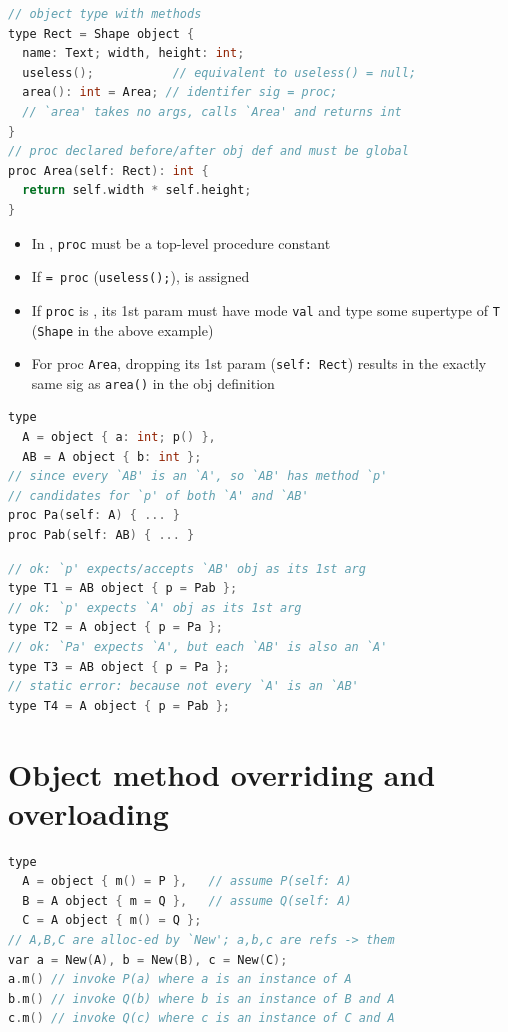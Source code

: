 \documentclass[10pt,a4paper,landscape]{article}
\begin{document}
\begin{multicols*}{3}
\begin{minipage}{\linewidth}
\begin{lstlisting}[language=c]
// object type with methods
type Rect = Shape object {
  name: Text; width, height: int;
  useless();           // equivalent to useless() = null;
  area(): int = Area; // identifer sig = proc;
  // `area' takes no args, calls `Area' and returns int
}
// proc declared before/after obj def and must be global
proc Area(self: Rect): int {
  return self.width * self.height;
}
\end{lstlisting}
\end{minipage}
\begin{itemize}
\item In , \texttt{proc} must be a top-level procedure constant
\item If \texttt{= proc}  (\texttt{useless();}),  is assigned
\item If \texttt{proc} is , its 1st param must have mode \texttt{val} and type some supertype of \texttt{T} (\texttt{Shape} in the above example)
\item For proc \texttt{Area}, dropping its 1st param (\texttt{self: Rect}) results in the exactly same sig as \texttt{area()} in the obj definition
\end{itemize}
\begin{minipage}{\linewidth}
\begin{lstlisting}[language=c]
type
  A = object { a: int; p() },
  AB = A object { b: int };
// since every `AB' is an `A', so `AB' has method `p'
// candidates for `p' of both `A' and `AB'
proc Pa(self: A) { ... }
proc Pab(self: AB) { ... }
\end{lstlisting}
\end{minipage}
\begin{minipage}{\linewidth}
\begin{lstlisting}[language=c]
// ok: `p' expects/accepts `AB' obj as its 1st arg
type T1 = AB object { p = Pab };
// ok: `p' expects `A' obj as its 1st arg
type T2 = A object { p = Pa };
// ok: `Pa' expects `A', but each `AB' is also an `A'
type T3 = AB object { p = Pa };
// static error: because not every `A' is an `AB'
type T4 = A object { p = Pab };
\end{lstlisting}
\end{minipage}
\section*{Object method overriding and overloading}
\begin{lstlisting}[language=c]
type
  A = object { m() = P },   // assume P(self: A)
  B = A object { m = Q },   // assume Q(self: A)
  C = A object { m() = Q };
// A,B,C are alloc-ed by `New'; a,b,c are refs -> them
var a = New(A), b = New(B), c = New(C);
a.m() // invoke P(a) where a is an instance of A
b.m() // invoke Q(b) where b is an instance of B and A
c.m() // invoke Q(c) where c is an instance of C and A


\end{lstlisting}
\end{multicols*}
\end{document}
